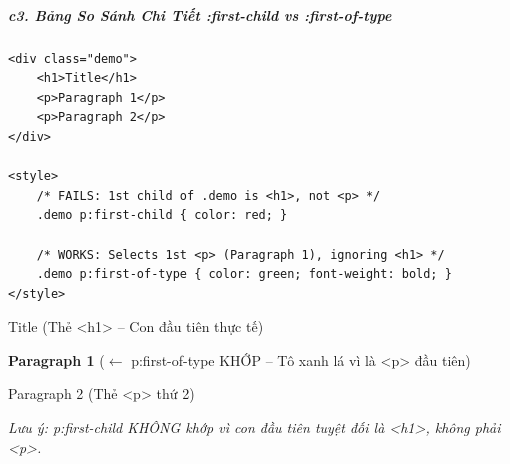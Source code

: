 \documentclass[11pt,oneside]{book}
\newcommand{\thd}[1]{\textcolor{white}{\textbf{\strut #1}}}
\begin{document}
\subparagraph{c3. Bảng So Sánh Chi Tiết :first-child vs :first-of-type}
\mbox{}\par\vspace{2pt}

\begin{codeWindow}
\begin{lstlisting}[language=HTML5]
<div class="demo">
    <h1>Title</h1>
    <p>Paragraph 1</p>
    <p>Paragraph 2</p>
</div>

<style>
    /* FAILS: 1st child of .demo is <h1>, not <p> */
    .demo p:first-child { color: red; }

    /* WORKS: Selects 1st <p> (Paragraph 1), ignoring <h1> */
    .demo p:first-of-type { color: green; font-weight: bold; }
</style>
\end{lstlisting}
\end{codeWindow}

\begin{browserWindow}
\sffamily\small
Title {\scriptsize\textcolor{gray!60}{(Thẻ <h1> -- Con đầu tiên thực tế)}} \par\vspace{2pt}
\textcolor{green!70!black}{\textbf{Paragraph 1}} {\scriptsize\textcolor{gray!60}{($\leftarrow$ p:first-of-type KHỚP -- Tô xanh lá vì là <p> đầu tiên)}} \par\vspace{2pt}
Paragraph 2 {\scriptsize\textcolor{gray!60}{(Thẻ <p> thứ 2)}} \par\vspace{4pt}
{\scriptsize\textcolor{gray!60}{\textit{Lưu ý: p:first-child KHÔNG khớp vì con đầu tiên tuyệt đối là <h1>, không phải <p>.}}}
\end{browserWindow}

\begin{prettyTableBox}
\sffamily\small
{}
\end{prettyTableBox}
\end{document}
